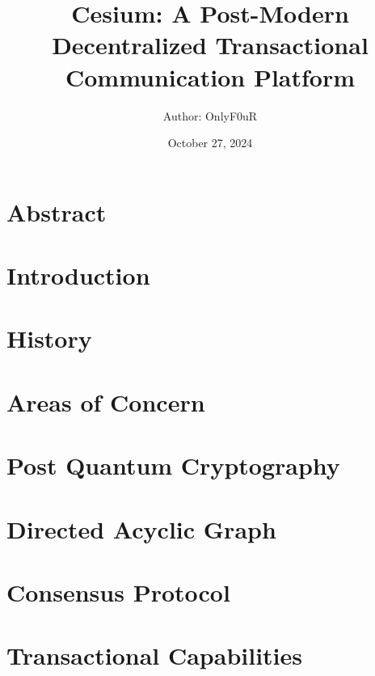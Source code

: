\documentclass[12px, letterpaper]{article}
\title{Cesium: A Post-Modern Decentralized Transactional Communication Platform}
\author{\normalsize Author: OnlyF0uR\\\normalsize}
\date {\color{black} October 27, 2024}
\begin{document}
\maketitle

\section{Abstract}

\lipsum[1]

\section{Introduction}

\lipsum[1-2]

\section{History}

\lipsum[1-4]

\section{Areas of Concern}
    
\lipsum[1-2]

\section{Post Quantum Cryptography}

\lipsum[1-4] 
    
\section{Directed Acyclic Graph}

\lipsum[1]

\section{Consensus Protocol}

\lipsum[1-6] 

\section{Transactional Capabilities}
\end{document}
